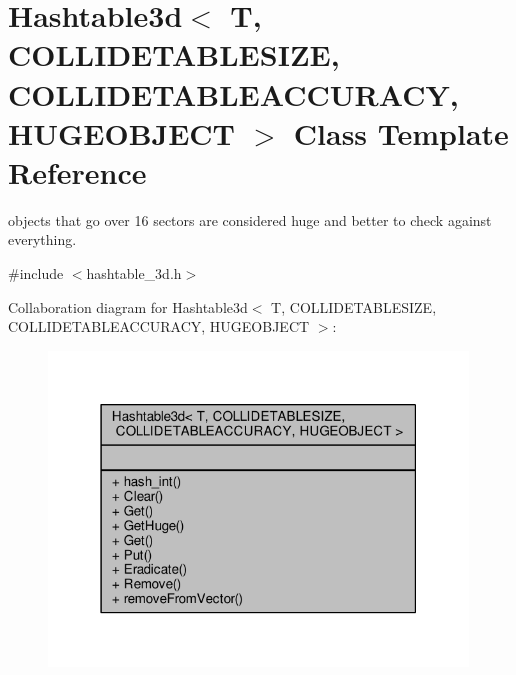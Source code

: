 \hypertarget{classHashtable3d}{}\section{Hashtable3d$<$ T, C\+O\+L\+L\+I\+D\+E\+T\+A\+B\+L\+E\+S\+I\+ZE, C\+O\+L\+L\+I\+D\+E\+T\+A\+B\+L\+E\+A\+C\+C\+U\+R\+A\+CY, H\+U\+G\+E\+O\+B\+J\+E\+CT $>$ Class Template Reference}
\label{classHashtable3d}


objects that go over 16 sectors are considered huge and better to check against everything.  




{\ttfamily \#include $<$hashtable\+\_\+3d.\+h$>$}



Collaboration diagram for Hashtable3d$<$ T, C\+O\+L\+L\+I\+D\+E\+T\+A\+B\+L\+E\+S\+I\+ZE, C\+O\+L\+L\+I\+D\+E\+T\+A\+B\+L\+E\+A\+C\+C\+U\+R\+A\+CY, H\+U\+G\+E\+O\+B\+J\+E\+CT $>$\+:
\nopagebreak
\begin{figure}[H]
\begin{center}
\leavevmode
\includegraphics[width=316pt]{df/d2a/classHashtable3d__coll__graph}
\end{center}
\end{figure}
